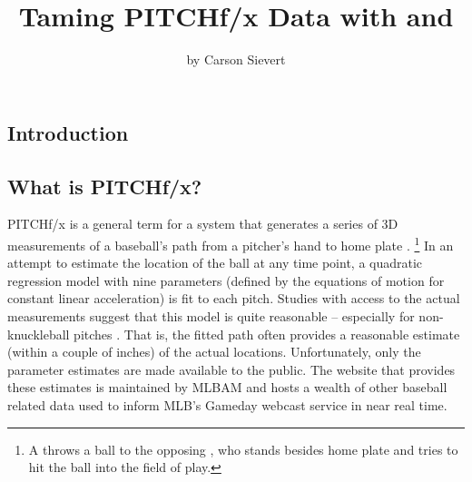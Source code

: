 \begin{article}




\title{Taming PITCHf/x Data with  and }


\author{by Carson Sievert}

\maketitle
{}


\section{Introduction}


\subsection{What is PITCHf/x?}

PITCHf/x is a general term for a system that generates a series of
3D measurements of a baseball's path from a pitcher's hand to home
plate \citep{patent}.%
\footnote{A  throws a ball to the opposing , who
stands besides home plate and tries to hit the ball into the field
of play.%
} In an attempt to estimate the location of the ball at any time point,
a quadratic regression model with nine parameters (defined by the
equations of motion for constant linear acceleration) is fit to each
pitch. Studies with access to the actual measurements suggest that
this model is quite reasonable -- especially for non-knuckleball pitches
\citep{trajecoryAnalysis}. That is, the fitted path often provides
a reasonable estimate (within a couple of inches) of the actual locations.
Unfortunately, only the parameter estimates are made available to
the public. The website that provides these estimates is maintained
by MLBAM and hosts a wealth of other baseball related data used to
inform MLB's Gameday webcast service in near real time.



\end{article}
